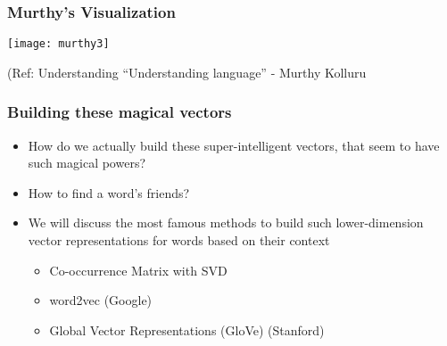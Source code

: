 \begin{frame}[fragile]\frametitle{Murthy's Visualization}

\begin{center}
\texttt{[image: murthy3]}

{\tiny (Ref: Understanding ``Understanding language'' - Murthy Kolluru}

\end{center}

\end{frame}


\begin{frame}[fragile]\frametitle{Building these magical vectors }
\begin{itemize}
\item How do we actually build these super-intelligent vectors, that seem to have such magical powers?
\item How to find a word's friends?
\item We will discuss the most famous methods to build such lower-dimension vector representations for words based on their context
\begin{itemize}
\item Co-occurrence Matrix with SVD
\item word2vec  (Google)
\item Global Vector Representations (GloVe)   (Stanford)
\end{itemize}
\end{itemize}
\end{frame}




